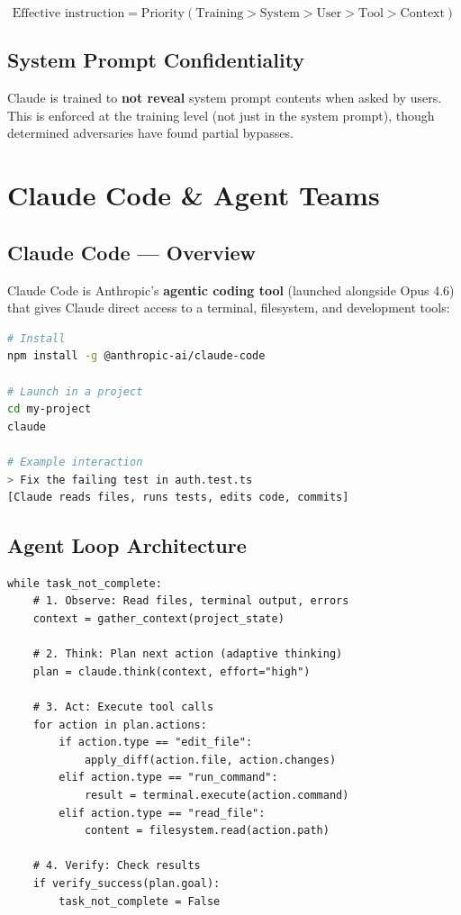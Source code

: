 \documentclass[11pt,a4paper]{article}
\begin{document}
$$\text{Effective instruction} = \text{Priority}(\text{Training} > \text{System} > \text{User} > \text{Tool} > \text{Context})$$

\subsection{System Prompt Confidentiality}

Claude is trained to \textbf{not reveal} system prompt contents when asked by users. This is enforced at the training level (not just in the system prompt), though determined adversaries have found partial bypasses.

\section{Claude Code \& Agent Teams}

\subsection{Claude Code --- Overview}

Claude Code is Anthropic's \textbf{agentic coding tool} (launched alongside Opus 4.6) that gives Claude direct access to a terminal, filesystem, and development tools:

\begin{lstlisting}[language=bash, caption={Starting Claude Code}]
# Install
npm install -g @anthropic-ai/claude-code

# Launch in a project
cd my-project
claude

# Example interaction
> Fix the failing test in auth.test.ts
[Claude reads files, runs tests, edits code, commits]
\end{lstlisting}

\subsection{Agent Loop Architecture}

\begin{tcolorbox}[colback=gray!5, colframe=gray!60!black, title={\bfseries Claude Code --- Agent Loop}]
\begin{lstlisting}[basicstyle=\ttfamily\small, frame=none, backgroundcolor=\color{gray!5}]
while task_not_complete:
    # 1. Observe: Read files, terminal output, errors
    context = gather_context(project_state)
    
    # 2. Think: Plan next action (adaptive thinking)
    plan = claude.think(context, effort="high")
    
    # 3. Act: Execute tool calls
    for action in plan.actions:
        if action.type == "edit_file":
            apply_diff(action.file, action.changes)
        elif action.type == "run_command":
            result = terminal.execute(action.command)
        elif action.type == "read_file":
            content = filesystem.read(action.path)
    
    # 4. Verify: Check results
    if verify_success(plan.goal):
        task_not_complete = False
\end{lstlisting}
\end{tcolorbox}
\end{document}
